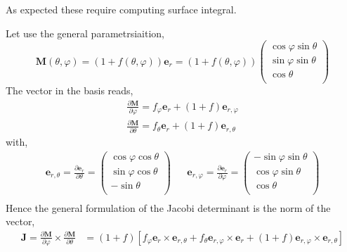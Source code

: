 As expected these require computing surface integral. 


Let use the general parametrsiaition, 
\begin{equation}
    \textbf{M}(\theta,\varphi)
    =
    (1 + f(\theta,\varphi)) \textbf{e}_r
    =
    (1 + f(\theta,\varphi)) 
    \begin{pmatrix}
        \cos \varphi \sin\theta\\
        \sin \varphi \sin\theta\\
        \cos\theta\\
    \end{pmatrix}
\end{equation}
The vector in the basis reads, 
\begin{align}
    \frac{\partial \textbf{M}}{\partial \varphi}
    =
    f_\varphi \textbf{e}_r
    + (1 + f) \textbf{e}_{r,\varphi}
    \\
    \frac{\partial \textbf{M}}{\partial \theta}
    =
    f_\theta \textbf{e}_r
    + (1 + f) \textbf{e}_{r,\theta}
\end{align}
with,
\begin{align}
    \textbf{e}_{r,\theta}
    =
    \frac{\partial \textbf{e}_r}{\partial \theta}
    = 
    \begin{pmatrix}
        \cos \varphi \cos\theta\\
        \sin \varphi \cos\theta\\
        -\sin\theta\\
    \end{pmatrix}
    &&
    \textbf{e}_{r,\varphi}
    =
    \frac{\partial \textbf{e}_r}{\partial \varphi}
    = 
    \begin{pmatrix}
        -\sin \varphi \sin\theta\\
        \cos \varphi \sin\theta\\
        \cos\theta\\
    \end{pmatrix}\\
\end{align}
Hence the general formulation of the Jacobi determinant is the norm of the vector,
\begin{align}
    \textbf{J} = 
    \frac{\partial \textbf{M}}{\partial \varphi}
    \times\frac{\partial \textbf{M}}{\partial \theta}
    &= 
    (1 + f)[
        f_\varphi \textbf{e}_r \times \textbf{e}_{r,\theta}
        + f_\theta  \textbf{e}_{r,\varphi} \times \textbf{e}_r
        + (1 + f) \textbf{e}_{r,\varphi}\times \textbf{e}_{r,\theta}
    ]\\
\end{align}
